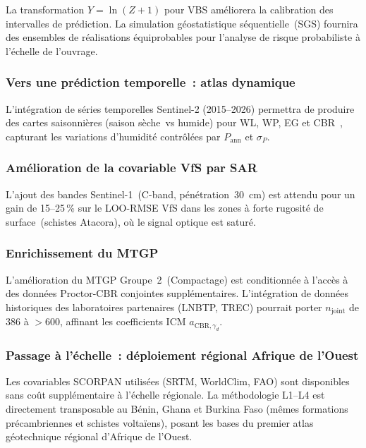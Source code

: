 \documentclass[10pt,a4paper,twocolumn]{article}
\begin{document}
	La transformation $Y=\ln(Z+1)$ pour VBS améliorera la
	calibration des intervalles de prédiction.
	La simulation géostatistique séquentielle~(SGS) fournira des
	ensembles de réalisations équiprobables pour l'analyse de risque
	probabiliste à l'échelle de l'ouvrage.
	
	\subsubsection{Vers une prédiction temporelle~: atlas dynamique}
	
	L'intégration de séries temporelles Sentinel-2 (2015--2026)
	permettra de produire des cartes saisonnières (saison sèche~vs
	humide) pour WL, WP, EG et CBR~\cite{gundogdu2007spatial},
	capturant les variations d'humidité contrôlées par
	$P_{\mathrm{ann}}$ et $\sigma_P$.
	
	\subsubsection{Amélioration de la covariable VfS par SAR}
	
	L'ajout des bandes Sentinel-1~(C-band, pénétration~30~cm) est
	attendu pour un gain de 15--25\,\% sur le LOO-RMSE VfS dans les
	zones à forte rugosité de surface~(schistes Atacora), où le signal
	optique est saturé.
	
	\subsubsection{Enrichissement du MTGP}
	
	L'amélioration du MTGP Groupe~2~(Compactage) est conditionnée à
	l'accès à des données Proctor-CBR conjointes supplémentaires.
	L'intégration de données historiques des laboratoires partenaires
	(LNBTP, TREC) pourrait porter $n_{\mathrm{joint}}$ de 386 à
	$>600$, affinant les coefficients ICM $a_{\mathrm{CBR},\gamma_d}$.
	
	\subsubsection{Passage à l'échelle~: déploiement régional Afrique de l'Ouest}
	
	Les covariables SCORPAN utilisées (SRTM, WorldClim, FAO) sont
	disponibles sans coût supplémentaire à l'échelle régionale.
	La méthodologie L1--L4 est directement transposable au Bénin,
	Ghana et Burkina Faso (mêmes formations précambriennes et
	schistes voltaïens), posant les bases du premier atlas
	géotechnique régional d'Afrique de l'Ouest.
	
\end{document}
